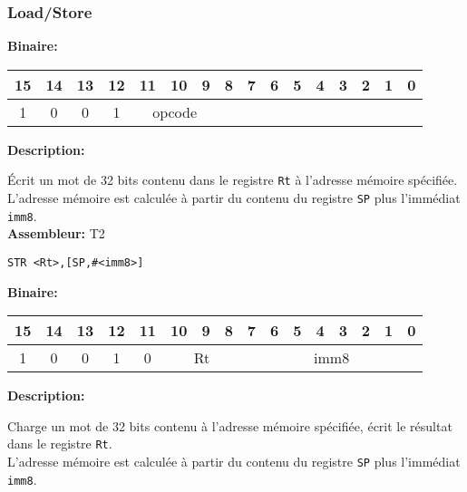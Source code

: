 \subsubsection{Load/Store}
\label{subsubsec:LoadStore}

\textbf{Binaire:}\\

\begin{tabular}{| c c c c c c c c c c c c c c c c |}
\hline
15 & 14 & 13 & 12 & \multicolumn{1}{|c}{11} & 10 & 9 & \multicolumn{1}{|c}{8} & 7 & 6 & 5 & 4 & 3 & 2 & 1 & 0 \\
\hline
1 & 0 & 0 & 1 & \multicolumn{3}{|c}{opcode} & \multicolumn{9}{|c|}{} \\
\hline
\end{tabular}


\textbf{Description: }

Écrit un mot de 32 bits contenu dans le registre \texttt{Rt} à l'adresse mémoire spécifiée.\\
L'adresse mémoire est calculée à partir du contenu du registre \texttt{SP} plus l'immédiat \texttt{imm8}.\\

\textbf{Assembleur:} T2

\begin{lstlisting}
STR <Rt>,[SP,#<imm8>]
\end{lstlisting}

\textbf{Binaire:}\\

\begin{tabular}{| c c c c c c c c c c c c c c c c |}
\hline
15 & 14 & 13 & 12 & \multicolumn{1}{|c}{11} & \multicolumn{1}{|c}{10} & 9 & 8 & \multicolumn{1}{|c}{7} & 6 & 5 & 4 & 3 & 2 & 1 & 0 \\
\hline
1 & 0 & 0 & 1 & \multicolumn{1}{|c}{0} & \multicolumn{3}{|c}{Rt} & \multicolumn{8}{|c|}{imm8} \\
\hline
\end{tabular}



\textbf{Description: }

Charge un mot de 32 bits contenu à l'adresse mémoire spécifiée, écrit le résultat dans le registre \texttt{Rt}.\\
L'adresse mémoire est calculée à partir du contenu du registre \texttt{SP} plus l'immédiat \texttt{imm8}.\\

